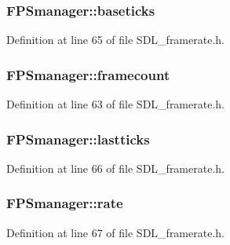 \subsubsection[{baseticks}]{ F\+P\+Smanager\+::baseticks}\label{struct_f_p_smanager_a1081a61aebaf2a5af71ecc9468ad30e0}


Definition at line 65 of file S\+D\+L\+\_\+framerate.\+h.

\hypertarget{struct_f_p_smanager_a1524f84f09c0a173ac84d0312e4cdac2}{}
\subsubsection[{framecount}]{ F\+P\+Smanager\+::framecount}\label{struct_f_p_smanager_a1524f84f09c0a173ac84d0312e4cdac2}


Definition at line 63 of file S\+D\+L\+\_\+framerate.\+h.

\hypertarget{struct_f_p_smanager_aa1382b38f899de904ec17d38c05090fc}{}
\subsubsection[{lastticks}]{ F\+P\+Smanager\+::lastticks}\label{struct_f_p_smanager_aa1382b38f899de904ec17d38c05090fc}


Definition at line 66 of file S\+D\+L\+\_\+framerate.\+h.

\hypertarget{struct_f_p_smanager_ae0a4f3f20f71f7bdfef055f5d0eac187}{}
\subsubsection[{rate}]{ F\+P\+Smanager\+::rate}\label{struct_f_p_smanager_ae0a4f3f20f71f7bdfef055f5d0eac187}


Definition at line 67 of file S\+D\+L\+\_\+framerate.\+h.

\hypertarget{struct_f_p_smanager_a501cd3ffc7112afbbb95b5d9495ef7d3}{}
